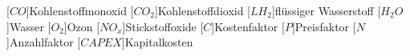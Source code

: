 \label{sec:Symbole}
\begin{acronym}[6LoWPAN]
	[$CO$]{Kohlenstoffmonoxid}
    [$CO_2$]{Kohlenstoffdioxid}
	[$LH_2$]{flüssiger Wasserstoff}
	[$H_2O$]{Wasser}
	[$O_2$]{Ozon}
	[$NO_x$]{Stickstoffoxide}
	[$C$]{Kostenfaktor}
	[$P$]{Preisfaktor}
	[$N$]{Anzahlfaktor}
	[$CAPEX$]{Kapitalkosten}
	
\end{acronym}
